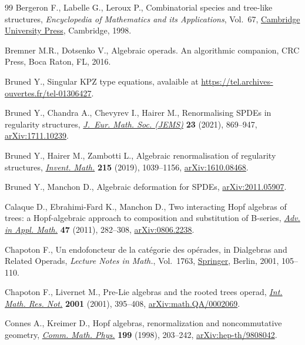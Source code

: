 \begin{thebibliography}{99}
\footnotesize\itemsep=0pt
Bergeron F., Labelle G., Leroux P., Combinatorial species and tree-like
 structures, \textit{Encyclopedia of Mathematics and its Applications},
 Vol.~67, \href{https://doi.org/10.1017/CBO9781107325913}{Cambridge University Press}, Cambridge, 1998.

Bremner M.R., Dotsenko V., Algebraic operads. An algorithmic companion, CRC
 Press, Boca Raton, FL, 2016.

Bruned Y., Singular {KPZ} type equations, avalaible at
 \url{https://tel.archives-ouvertes.fr/tel-01306427}.

Bruned Y., Chandra A., Chevyrev I., Hairer M., Renormalising {SPDE}s in
 regularity structures, \href{https://doi.org/10.4171/jems/1025}{\textit{J.~Eur. Math. Soc. (JEMS)}} \textbf{23} (2021),
 869--947, \href{https://arxiv.org/abs/1711.10239}{arXiv:1711.10239}.

Bruned Y., Hairer M., Zambotti L., Algebraic renormalisation of regularity
 structures, \href{https://doi.org/10.1007/s00222-018-0841-x}{\textit{Invent. Math.}} \textbf{215} (2019), 1039--1156,
 \href{https://arxiv.org/abs/1610.08468}{arXiv:1610.08468}.

Bruned Y., Manchon D., Algebraic deformation for {SPDE}s, \href{https://arxiv.org/abs/2011.05907}{arXiv:2011.05907}.

Calaque D., Ebrahimi-Fard K., Manchon D., Two interacting {H}opf algebras of
 trees: a {H}opf-algebraic approach to composition and substitution of
 {B}-series, \href{https://doi.org/10.1016/j.aam.2009.08.003}{\textit{Adv. in Appl. Math.}} \textbf{47} (2011), 282--308,
 \href{https://arxiv.org/abs/0806.2238}{arXiv:0806.2238}.

Chapoton F., Un endofoncteur de la cat\'egorie des op\'erades, in Dialgebras
 and Related Operads, \textit{Lecture Notes in Math.}, Vol.~1763, \href{https://doi.org/10.1007/3-540-45328-8_4}{Springer},
 Berlin, 2001, 105--110.

Chapoton F., Livernet M., Pre-{L}ie algebras and the rooted trees operad,
 \href{https://doi.org/10.1155/S1073792801000198}{\textit{Int. Math. Res. Not.}} \textbf{2001} (2001), 395--408,
 \href{https://arxiv.org/abs/math.QA/0002069}{arXiv:math.QA/0002069}.

Connes A., Kreimer D., Hopf algebras, renormalization and noncommutative
 geometry, \href{https://doi.org/10.1007/s002200050499}{\textit{Comm. Math. Phys.}} \textbf{199} (1998), 203--242,
 \href{https://arxiv.org/abs/hep-th/9808042}{arXiv:hep-th/9808042}.


\end{thebibliography}
